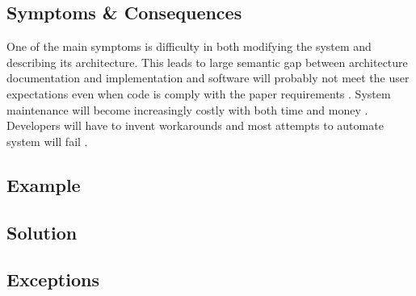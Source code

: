 \subsection{Symptoms \& Consequences}

One of the main symptoms is difficulty in both modifying the system and describing its architecture. This leads to large semantic gap between architecture documentation and implementation and software will probably not meet the user expectations even when code is comply with the paper requirements \cite{Virtual}. System maintenance will become increasingly costly with both time and money \cite{SurvivalGuide,Virtual}. Developers will have to invent workarounds and most attempts to automate system will fail \cite{SurvivalGuide}.

\subsection{Example}

\subsection{Solution}

\subsection{Exceptions}